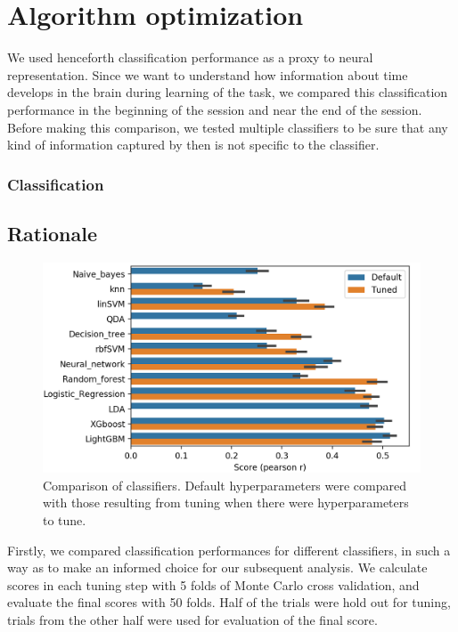 \chapter{Algorithm optimization}
\label{chap:results}

We used henceforth classification performance as a proxy to neural representation. Since we want to understand how information about time develops in the brain during learning of the task, we compared this classification performance in the beginning of the session and near the end of the session. Before making this comparison, we tested multiple classifiers to be sure that any kind of information captured by then is not specific to the classifier.
\subsection{Classification}

\section{Rationale}
    \begin{figure}
        \centering
        \includegraphics[width=\textwidth]{figures/hyperparameter_tuning_12_classifiers.png}
        \caption[Comparison of classifiers]{Comparison of classifiers. Default hyperparameters were compared with those resulting from tuning when there were hyperparameters to tune.}
        \label{fig:clf_comparison}
    \end{figure} %
    Firstly, we compared classification performances for different classifiers, in such a way as to make an informed choice for our subsequent analysis. We calculate scores in each tuning step with 5 folds of Monte Carlo cross validation, and evaluate the final scores with 50 folds. Half of the trials were hold out for tuning, trials from the other half were used for evaluation of the final score.
    
